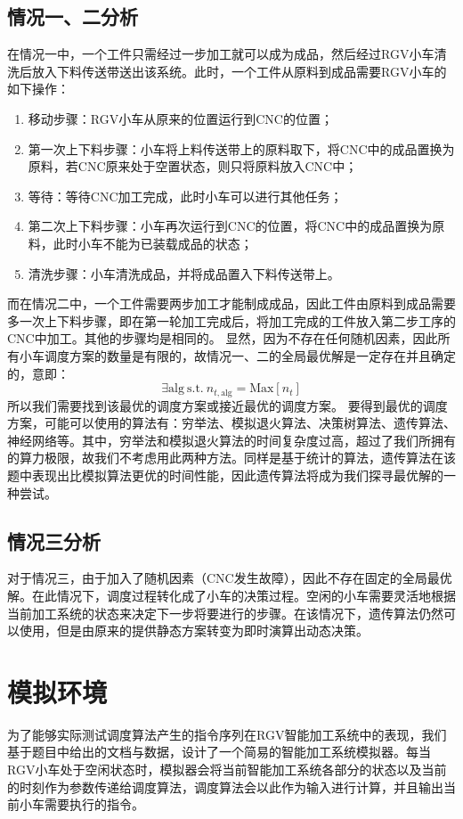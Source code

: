 \documentclass{cumcmthesis}
\begin{document}
\subsection{情况一、二分析}
在情况一中，一个工件只需经过一步加工就可以成为成品，然后经过RGV小车清洗后放入下料传送带送出该系统。此时，一个工件从原料到成品需要RGV小车的如下操作：
\begin{enumerate}
    \item 移动步骤：RGV小车从原来的位置运行到CNC的位置；
    \item 第一次上下料步骤：小车将上料传送带上的原料取下，将CNC中的成品置换为原料，若CNC原来处于空置状态，则只将原料放入CNC中；
    \item 等待：等待CNC加工完成，此时小车可以进行其他任务；
    \item 第二次上下料步骤：小车再次运行到CNC的位置，将CNC中的成品置换为原料，此时小车不能为已装载成品的状态；
    \item 清洗步骤：小车清洗成品，并将成品置入下料传送带上。
\end{enumerate}
而在情况二中，一个工件需要两步加工才能制成成品，因此工件由原料到成品需要多一次上下料步骤，即在第一轮加工完成后，将加工完成的工件放入第二步工序的CNC中加工。其他的步骤均是相同的。\newline
显然，因为不存在任何随机因素，因此所有小车调度方案的数量是有限的，故情况一、二的全局最优解是一定存在并且确定的，意即：
\[\exists\textrm{alg}\ \textrm{s.t.}\ n_{t, \textrm{alg}}=\textrm{Max}[n_t]\]
所以我们需要找到该最优的调度方案或接近最优的调度方案。\newline
要得到最优的调度方案，可能可以使用的算法有：穷举法、模拟退火算法、决策树算法、遗传算法、神经网络等。其中，穷举法和模拟退火算法的时间复杂度过高，超过了我们所拥有的算力极限，故我们不考虑用此两种方法。同样是基于统计的算法，遗传算法在该题中表现出比模拟算法更优的时间性能，因此遗传算法将成为我们探寻最优解的一种尝试。

\subsection{情况三分析}
对于情况三，由于加入了随机因素（CNC发生故障），因此不存在固定的全局最优解。在此情况下，调度过程转化成了小车的决策过程。空闲的小车需要灵活地根据当前加工系统的状态来决定下一步将要进行的步骤。在该情况下，遗传算法仍然可以使用，但是由原来的提供静态方案转变为即时演算出动态决策。

\section{模拟环境}
为了能够实际测试调度算法产生的指令序列在RGV智能加工系统中的表现，我们基于题目中给出的文档与数据，设计了一个简易的智能加工系统模拟器。每当RGV小车处于空闲状态时，模拟器会将当前智能加工系统各部分的状态以及当前的时刻作为参数传递给调度算法，调度算法会以此作为输入进行计算，并且输出当前小车需要执行的指令。
\end{document}
